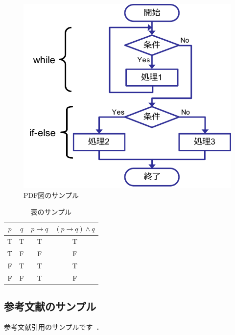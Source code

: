 \documentclass[a4paper, 9pt]{jarticle}
\begin{document}
\begin{論文概要}
\begin{figure}[ht]
\centering
\includegraphics[scale=0.6,clip]{2-2.pdf}
\caption{PDF図のサンプル}
\label{fig:sample2}
\end{figure}

\begin{table}[ht]
\centering
\caption{表のサンプル}
\label{tbl:sample1}
\begin{tabular}{|c|c||c|c|} \hline
$p$ & $q$ & $p\rightarrow q$ & $(p\rightarrow q)\wedge q$ \\ \hline
T & T & T & T \\ \hline
T & F & F & F \\ \hline
F & T & T & T \\ \hline
F & F & T & F \\ \hline
\end{tabular}
\end{table}

\subsection{参考文献のサンプル}
参考文献引用のサンプルです~\cite{paper1}\cite{paper2}．

\end{論文概要} %
\end{document}
